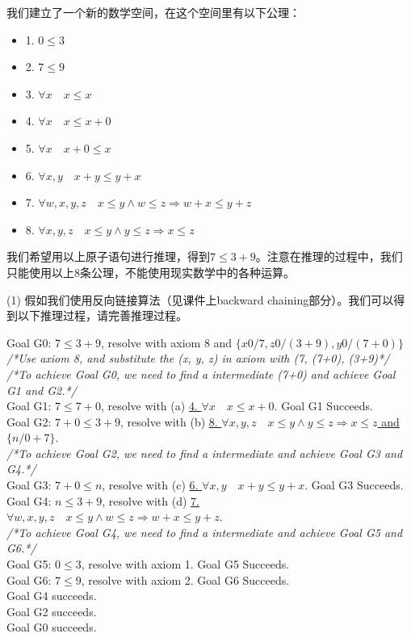 \begin{problem}
\indent 我们建立了一个新的数学空间，在这个空间里有以下公理：
\begin{itemize}
    \item 1. $0 \leq 3$
    \item 2. $7 \leq 9$
    \item 3. $\forall x\quad x\leq x$
    \item 4. $\forall x \quad x\leq x+0$
    \item 5. $\forall x \quad x+0 \leq x$
    \item 6. $\forall x,y \quad x+y\leq y+x$
    \item 7. $\forall w,x,y,z \quad x\leq y \land w\leq z \Rightarrow w+x \leq y+z$
    \item 8. $\forall x,y,z \quad x\leq y \land y\leq z \Rightarrow x \leq z$
\end{itemize}

\indent 我们希望用以上原子语句进行推理，得到$7\leq 3+9$。注意在推理的过程中，我们只能使用以上8条公理，不能使用现实数学中的各种运算。

\indent (1) 假如我们使用反向链接算法（见课件上backward chaining部分）。我们可以得到以下推理过程，请完善推理过程。

\indent Goal G0: $7\leq 3+9$, resolve with axiom 8 and $\{ x0/7, z0/(3+9), y0/(7+0)\}$ \\
\indent \textit{/*Use axiom 8, and substitute the (x, y, z) in axiom with (7, (7+0), (3+9)*/}\\
\indent \textit{/*To achieve Goal G0, we need to find a intermediate (7+0) and achieve Goal G1 and G2.*/}\\
\indent \indent Goal G1: $7\leq 7+0$, resolve with (a) \underline{4. $\forall x\quad x\leq x+0$}. Goal G1 Succeeds.\\
\indent \indent Goal G2: $7+0 \leq 3+9$, resolve with (b) \underline{8. $\forall x,y,z \quad x\leq y \land y\leq z \Rightarrow x \leq z$ and $\{n/0+7\}$}. \\
\indent \textit{/*To achieve Goal G2, we need to find a intermediate and achieve Goal G3 and G4.*/}\\
\indent \indent \indent Goal G3: $7+0\leq n$, resolve with (c) \underline{6. $\forall x,y \quad x+y\leq y+x$}. Goal G3 Succeeds.\\
\indent \indent \indent Goal G4: $n\leq 3+9$, resolve with (d) \underline{7. $\forall w,x,y,z \quad x\leq y \land w\leq z \Rightarrow w+x \leq y+z$}. \\
\indent \textit{/*To achieve Goal G4, we need to find a intermediate and achieve Goal G5 and G6.*/}\\
\indent \indent \indent \indent Goal G5: $0\leq 3$, resolve with axiom 1. Goal G5 Succeeds.\\
\indent \indent \indent \indent Goal G6: $7\leq 9$, resolve with axiom 2. Goal G6 Succeeds.\\
\indent \indent \indent  Goal G4 succeeds.\\
\indent \indent   Goal G2 succeeds.\\
\indent  Goal G0 succeeds.\\


\end{problem}
